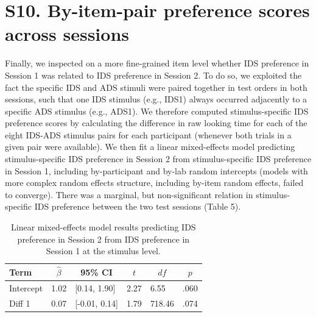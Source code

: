 \documentclass[
  man, donotrepeattitle,floatsintext]{apa6}
\begin{document}
\newpage

\hypertarget{s10.-by-item-pair-preference-scores-across-sessions}{%
\section{S10. By-item-pair preference scores across sessions}\label{s10.-by-item-pair-preference-scores-across-sessions}}

Finally, we inspected on a more fine-grained item level whether IDS preference in Session 1 was related to IDS preference in Session 2.
To do so, we exploited the fact the specific IDS and ADS stimuli were paired together in test orders in both sessions, such that one IDS stimulus (e.g., IDS1) always occurred adjacently to a specific ADS stimulus (e.g., ADS1).
We therefore computed stimulus-specific IDS preference scores by calculating the difference in raw looking time for each of the eight IDS-ADS stimulus pairs for each participant (whenever both trials in a given pair were available).
We then fit a linear mixed-effects model predicting stimulus-specific IDS preference in Session 2 from stimulus-specific IDS preference in Session 1, including by-participant and by-lab random intercepts (models with more complex random effects structure, including by-item random effects, failed to converge).
There was a marginal, but non-significant relation in stimulus-specific IDS preference between the two test sessions (Table 5).

\begin{table}[tbp]

\begin{center}
\begin{threeparttable}

\caption{\label{tab:unnamed-chunk-40}Linear mixed-effects model results predicting IDS preference in Session 2 from IDS preference in Session 1 at the stimulus level.}

\begin{tabular}{llllll}
\toprule
Term & \multicolumn{1}{c}{$\hat{\beta}$} & \multicolumn{1}{c}{95\% CI} & \multicolumn{1}{c}{$t$} & \multicolumn{1}{c}{$\mathit{df}$} & \multicolumn{1}{c}{$p$}\\
\midrule
Intercept & 1.02 & {}[0.14, 1.90] & 2.27 & 6.55 & .060\\
Diff 1 & 0.07 & {}[-0.01, 0.14] & 1.79 & 718.46 & .074\\
\bottomrule
\end{tabular}

\end{threeparttable}
\end{center}

\end{table}
\end{document}
